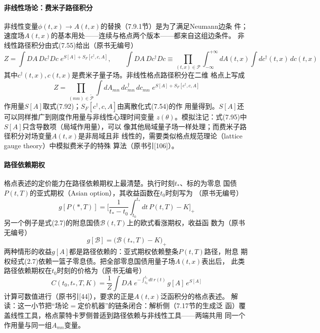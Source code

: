 \paragraph{非线性场论：费米子路径积分}
非线性变量$\phi(t,x)\to A(t,x)$的替换（7.9.1节）是为了满足Neumann边条
件；速度场$A(t,x)$的基本用处——连续与格点两个版本——都来自这组边条件。
非线性路径积分由式(7.55)给出（原书无编号）
\begin{equation*}
Z=\int DA\,Dc^{\dagger}Dc\;e^{S[A]+S_{F}[c^{\dagger},c,A]},
\qquad
\int DA\,Dc^{\dagger}Dc\equiv\prod_{(t,x)\in\mathcal{P}}
\int_{-\infty}^{+\infty}dA(t,x)\int dc^{\dagger}(t,x)\,dc(t,x)
\end{equation*}
其中$c^{\dagger}(t,x),c(t,x)$是费米子量子场。非线性格点路径积分在二维
格点上写成
\begin{equation*}
Z=\prod_{(mn)\in\tilde{\mathcal{P}}}\int dA_{mn}\,dc^{\dagger}_{mn}\,
dc_{mn}\;e^{S[A]+S_{F}[c^{\dagger},c,A]}
\tag{7.95}
\end{equation*}
作用量$S[A]$取式(7.92)；$S_{F}[c^{\dagger},c,A]$由离散化式(7.54)的作
用量得到。$S[A]$还可以同样推广到刚度作用量与非线性心理时间变量
$z(\theta)$。模拟注记：式(7.95)中$S[A]$只含导数项（局域作用量），可以
像其他局域量子场一样处理；而费米子路径积分对场变量$A(t,x)$是非局域且非
线性的，需要类似格点规范理论（lattice gauge theory）中模拟费米子的特殊
算法（原书引[106]）。

\paragraph{路径依赖期权}
格点表述的定价能力在路径依赖期权上最清楚。执行时刻$t_{*}$、标的为零息
国债$P(t,T)$的亚式期权（Asian option），其收益函数在$t_{0}$时刻写为
（原书无编号）
\begin{equation*}
g[P(*,T)]=\biggl[\frac{1}{t_{*}-t_{0}}\int_{t_{0}}^{t_{*}}dt\,P(t,T)-K
\biggr]_{+}
\end{equation*}
另一个例子是式(2.7)的附息国债$\mathcal{B}(t,T)$上的欧式看涨期权，收益函
数为（原书无编号）
\begin{equation*}
g[\mathcal{B}]=\bigl(\mathcal{B}(t_{*},T)-K\bigr)_{+}
\end{equation*}
两种情形的收益$g[A]$都是路径依赖的：亚式期权依赖整条$P(t,T)$路径，附息
期权经式(2.7)依赖一篮子零息债。把全部零息国债用量子场$A(t,x)$表出后，
此类路径依赖期权在$t_{0}$时刻的价格为（原书无编号）
\begin{equation*}
C(t_{0},t_{*},T,K)=\frac{1}{Z}\int DA\;
e^{-\int_{t_{0}}^{t_{*}}dt\,r(t)}\,g[A]\,e^{S[A]}
\end{equation*}
计算可数值进行（原书引[44]），要求的正是$A(t,x)$泛函积分的格点表述。
解读：这一小节把“场论$=$定价机器”的链条闭合：解析侧（7.17节的生成泛
函）覆盖线性工具，格点蒙特卡罗侧普适到路径依赖与非线性工具——两端共用
同一个作用量与同一组$A_{mn}$变量。

